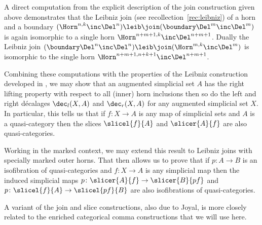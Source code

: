   \begin{obs}\label{obs:slice-and-qcats}
    A direct computation from the explicit description of the join construction given above demonstrates that the Leibniz join (see recollection~\ref{rec:leibniz}) of a horn and a boundary $(\Horn^{n,k}\inc\Del^n)\leib\join(\boundary\Del^m\inc\Del^m)$ is again isomorphic to a single horn $\Horn^{n+m+1,k}\inc\Del^{n+m+1}$. Dually the Leibniz join $(\boundary\Del^n\inc\Del^n)\leib\join(\Horn^{m,k}\inc\Del^m)$ is isomorphic to the single horn $\Horn^{n+m+1,n+k+1}\inc\Del^{n+m+1}$. 

    Combining these computations with the properties of the Leibniz construction developed in \cite[\S\ref*{reedy:sec:Leibniz-Reedy}]{RiehlVerity:2013kx}, we may show that an augmented simplicial set $A$ has the right lifting property with respect to all (inner) horn inclusions then so do the left and right d{\'e}calages $\dec_l(X,A)$ and $\dec_r(X,A)$ for any augmented simplicial set $X$. In particular, this tells us that if $f\colon X\to A$ is any map of simplicial sets and $A$ is a quasi-category then the slices $\slicel{f}{A}$ and $\slicer{A}{f}$ are also quasi-categories. 

    Working in the marked context, we may extend this result to Leibniz joins with specially marked outer horns. That then allows us to prove that if $p\colon A\to B$ is an isofibration of quasi-categories and $f\colon X\to A$ is any simplicial map then the induced simplicial maps $p\colon \slicer{A}{f}\to \slicer{B}{pf}$ and $p\colon \slicel{f}{A}\to \slicel{pf}{B}$ are also isofibrations of quasi-categories.
  \end{obs}

A variant of the join and slice constructions, also due to Joyal, is more closely related to the enriched categorical comma constructions that we will use here.

